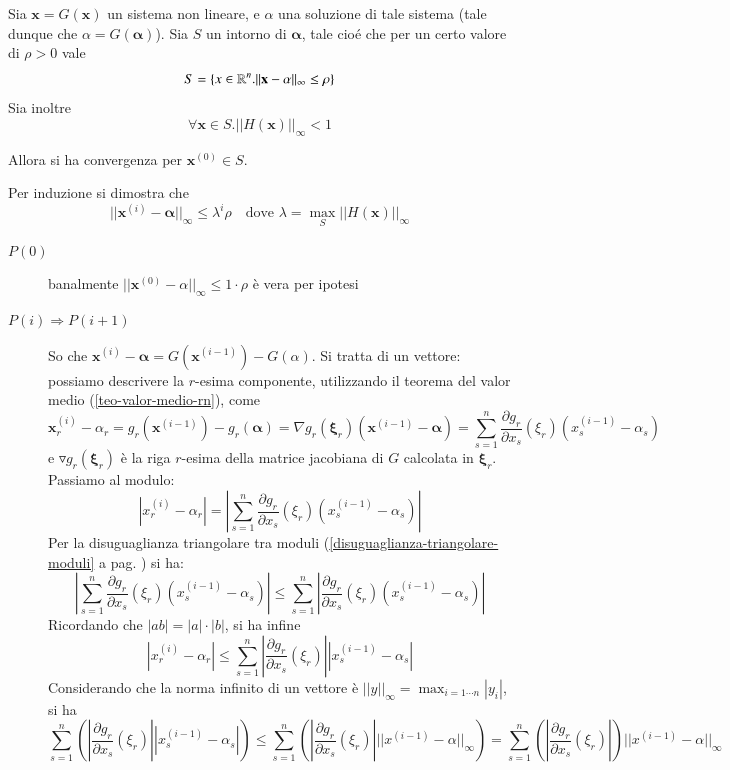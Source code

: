 \begin{theo}
Sia $ \mathbf{x} = G(\mathbf{x}) $ un sistema non lineare, e $ \alpha $ una soluzione di
tale sistema (tale dunque che $ \alpha = G(\mathbf{\alpha}) $). Sia $S$ un
intorno di $ \mathbf{\alpha} $, tale cio\'e che per un certo valore di $ \rho >
0 $ vale
\[ S = \left\lbrace x \in \mathbb{R}^n. || \mathbf{x} - \mathbf{\alpha} ||_{\infty} \leq \rho \right\rbrace \]
Sia inoltre
\[ \forall \mathbf{x} \in S.||H(\mathbf{x})||_{\infty} < 1 \]

Allora si ha convergenza per $ \mathbf{x}^{(0)} \in S $.
\end{theo}
\begin{thproof}
Per induzione si dimostra che
$$ || \mathbf{x}^{(i)} - \mathbf{\alpha} ||_{\infty} \leq \lambda^{i}\rho \quad
\text{dove } \lambda = \max_{S}||H(\mathbf{x})||_{\infty} $$

\begin{description}
\item[$ P(0) $] banalmente $ || \mathbf{x}^{(0)} - \alpha ||_{\infty} \leq 1
  \cdot \rho $ \`e  vera per ipotesi
\item[$ P(i) \Rightarrow P(i+1) $] So che $ \mathbf{x}^{(i)} - \mathbf{\alpha} =
  G(\mathbf{x}^{(i-1)}) - G(\alpha) $. Si tratta di un vettore: possiamo
  descrivere la $r$-esima componente, utilizzando il teorema del valor
  medio (\ref{teo-valor-medio-rn}), come
$$ \mathbf{x}^{(i)}_{r} - \alpha_{r} = g_r(\mathbf{x}^{(i-1)}) - g_r(\mathbf{\alpha}) =
 \nabla g_r (\mathbf{\xi}_r) ( \mathbf{x}^{(i-1)} - \mathbf{\alpha} )
 = \displaystyle \sum_{s=1}^{n} \dfrac{\partial g_r}{\partial x_s}(\xi_r)  (x_s^{(i-1)} - \alpha_s)
$$
e
$ \triangledown g_r (\mathbf{\xi}_r) $ \`e la riga $r$-esima della matrice
jacobiana di $G$ calcolata in $ \mathbf{\xi}_r $. Passiamo al modulo:
$$| x_r^{(i)} - \alpha_r | = \left| \displaystyle \sum_{s=1}^{n} \dfrac{\partial g_r}{\partial x_s}(\xi_r)  (x_s^{(i-1)} - \alpha_s) \right| $$
Per la disuguaglianza triangolare tra moduli (\ref{disuguaglianza-triangolare-moduli} a pag. \pageref{disuguaglianza-triangolare-moduli}) si ha:
$$ \left| \displaystyle \sum_{s=1}^{n} \dfrac{\partial g_r}{\partial x_s}(\xi_r)  (x_s^{(i-1)} - \alpha_s) \right| \leq 
\displaystyle \sum_{s=1}^{n} \left|\dfrac{\partial g_r}{\partial x_s}(\xi_r) (x_s^{(i-1)} - \alpha_s) \right| $$
Ricordando che $|ab|=|a|\cdot|b|$, si ha infine
$$| x_r^{(i)} - \alpha_r | \leq \sum^{n}_{s = 1} \left| \dfrac{\partial g_r}{\partial x_s}(\xi_r) \right| \left| x^{(i-1)}_s - \alpha_s \right| $$
Considerando che la norma infinito di un vettore è $|| y ||_{\infty} = \displaystyle \max_{i=1 \cdots n}|y_i|$, si ha
$$\sum^{n}_{s = 1} \left(\left| \dfrac{\partial g_r}{\partial x_s}(\xi_r) \right| \left| x^{(i-1)}_s - \alpha_s \right|\right)
\leq \sum^{n}_{s = 1} \left(\left| \dfrac{\partial g_r}{\partial x_s}(\xi_r) \right| || x^{(i-1)} - \alpha ||_{\infty} \right)
= \sum^{n}_{s = 1} \left(\left| \dfrac{\partial g_r}{\partial x_s}(\xi_r) \right| \right) || x^{(i-1)} - \alpha ||_{\infty}$$


\end{description}
\end{thproof}
